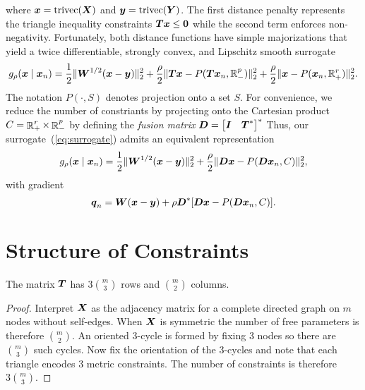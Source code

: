 \documentclass{article}
\begin{document}
where \(\boldsymbol{x} = \mathrm{trivec}(\boldsymbol{X})\) and \(\boldsymbol{y} = \mathrm{trivec}(\boldsymbol{Y})\).
The first distance penalty represents the triangle inequality constraints \(\boldsymbol{T} \boldsymbol{x} \le {\bf 0}\) while the second term enforces non-negativity.
Fortunately, both distance functions have simple majorizations that yield a twice differentiable, strongly convex, and Lipschitz smooth surrogate
\begin{equation}
    \label{eq:surrogate}
    g_{\rho}(\boldsymbol{x} \mid \boldsymbol{x}_{n})
    =
    \frac{1}{2} \lVert{\boldsymbol{W}^{1/2} (\boldsymbol{x}- \boldsymbol{y})}\rVert^{2}_{2}
    +
    \frac{\rho}{2} \lVert{\boldsymbol{T}\boldsymbol{x}- P(\boldsymbol{T}\boldsymbol{x}_{n}, \mathbb{R}_{-}^{p})}\rVert^{2}_{2}
    +
    \frac{\rho}{2} \lVert{\boldsymbol{x}- P(\boldsymbol{x}_{n}, \mathbb{R}_{+}^{r})}\rVert^{2}_{2}.
\end{equation}
The notation \(P(\cdot, S)\) denotes projection onto a set \(S\).
For convenience, we reduce the number of constriants by projecting onto the Cartesian product \(C = \mathop{\mathbb{R}}\nolimits_{+}^{r} \times \mathop{\mathbb{R}}\nolimits_{-}^{p}\) by defining the \textit{fusion matrix}
\(\boldsymbol{D} = \begin{bmatrix}
    \boldsymbol{I} & \boldsymbol{T}^{\ast}
\end{bmatrix}^{\ast}\)
Thus, our surrogate~(\ref{eq:surrogate}) admits an equivalent representation
\begin{equation*}
    g_{\rho}(\boldsymbol{x} \mid \boldsymbol{x}_{n})
    =
    \frac{1}{2} \lVert{\boldsymbol{W}^{1/2} (\boldsymbol{x}- \boldsymbol{y})}\rVert^{2}_{2}
    +
    \frac{\rho}{2} \lVert{\boldsymbol{D}\boldsymbol{x}- P(\boldsymbol{D}\boldsymbol{x}_{n}, C)}\rVert^{2}_{2},
\end{equation*}
with gradient
\begin{equation}
    \label{eq:surrogate-gradient}
    \boldsymbol{q}_{n}
    =
    \boldsymbol{W} (\boldsymbol{x} - \boldsymbol{y})
    +
    \rho \boldsymbol{D}^{\ast} [\boldsymbol{D} \boldsymbol{x} - P(\boldsymbol{D} \boldsymbol{x}_{n}, C)].
\end{equation}

\section*{\center Structure of Constraints}

\begin{proposition}
    The matrix \(\boldsymbol{T}\) has \(3 \binom{m}{3}\) rows and \(\binom{m}{2}\) columns.
\end{proposition}
\begin{proof}
    Interpret \(\boldsymbol{X}\) as the adjacency matrix for a complete directed graph on \(m\) nodes without self-edges.
    When \(\boldsymbol{X}\) is symmetric the number of free parameters is therefore \(\binom{m}{2}\).
    An oriented \(3\)-cycle is formed by fixing \(3\) nodes so there are \(\binom{m}{3}\) such cycles.
    Now fix the orientation of the \(3\)-cycles and note that each triangle encodes \(3\) metric constraints.
    The number of constraints is therefore \(3 \binom{m}{3}\).
\end{proof}
\end{document}
